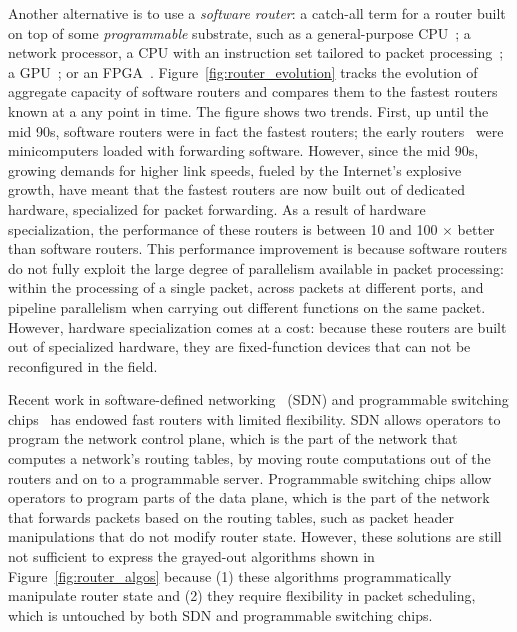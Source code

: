Another alternative is to use a \textit{software router}: a catch-all term for
a router built on top of some \textit{programmable} substrate, such as a
general-purpose CPU~\cite{click, routebricks}; a network processor, a CPU with
an instruction set tailored to packet processing~\cite{ixp4xx, ixp2800}; a
GPU~\cite{packetshader}; or an FPGA~\cite{netfpga}.
Figure~\ref{fig:router_evolution} tracks the evolution of aggregate capacity of
software routers and compares them to the fastest routers known at a any point
in time. The figure shows two trends. First, up until the mid 90s, software
routers were in fact the fastest routers; the early routers~\cite{imp} were
minicomputers loaded with forwarding software. However, since the mid 90s,
growing demands for higher link speeds, fueled by the Internet's explosive
growth, have meant that the fastest routers are now built out of dedicated
hardware, specialized for packet forwarding. As a result of hardware
specialization, the performance of these routers is between 10 and 100 $\times$
better than software routers.  This performance improvement is because software
routers do not fully exploit the large degree of parallelism available in
packet processing: within the processing of a single packet, across packets at
different ports, and pipeline parallelism when carrying out different functions
on the same packet. However, hardware specialization comes at a cost: because
these routers are built out of specialized hardware, they are fixed-function
devices that can not be reconfigured in the field.

Recent work in software-defined networking~\cite{openflow} (SDN) and
programmable switching chips~\cite{rmt, xpliant, flexpipe} has endowed fast
routers with limited flexibility. SDN allows operators to program the network
control plane, which is the part of the network that computes a network's
routing tables, by moving route computations out of the routers and on to a
programmable server. Programmable switching chips allow operators to program
parts of the data plane, which is the part of the network that forwards packets
based on the routing tables, such as packet header manipulations that do not
modify router state.  However, these solutions are still not sufficient to
express the grayed-out algorithms shown in Figure~\ref{fig:router_algos}
because (1) these algorithms programmatically manipulate router state and (2)
they require flexibility in packet scheduling, which is untouched by both SDN
and programmable switching chips.

